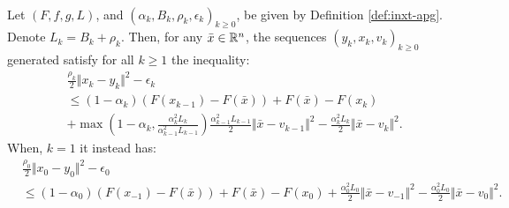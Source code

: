 \documentclass[12pt]{article}
\begin{document}
    \begin{lemma}\; \label{lemma:inxt-apg-cnvg-prep1}\\
        Let $(F, f, g, L)$, and $(\alpha_k, B_k, \rho_k, \epsilon_k)_{k \ge 0}$, be given by Definition \ref{def:inxt-apg}. 
        Denote $L_k = B_k + \rho_k$. 
        Then, for any $\bar x \in \mathbb R^n$, the sequences $(y_k, x_k, v_k)_{k \ge 0}$ generated satisfy for all $k \ge 1$ the inequality: 
        \begin{align*}
            & \frac{\rho_k}{2}\Vert x_k - y_k\Vert^2 - \epsilon_k
            \\
            &\le 
            (1 - \alpha_k)(F(x_{k - 1}) - F(\bar x)) + F(\bar x) - F(x_k) 
            \\ &
            + \max\left(
                    1 - \alpha_k, \frac{\alpha_k^2L_k}{\alpha_{k - 1}^2L_{k - 1}}
                \right)\frac{\alpha_{k - 1}^2L_{k - 1}}{2}\Vert \bar x - v_{k - 1}\Vert^2 
            - \frac{\alpha_k^2L_k}{2}\Vert \bar x - v_k\Vert^2. 
        \end{align*}
        When, $k = 1$ it instead has: 
        \begin{align*}
            & \frac{\rho_0}{2}\Vert x_0 - y_0\Vert^2 - \epsilon_0 
            \\
            &\le 
            (1 - \alpha_0)(F(x_{-1}) - F(\bar x)) + F(\bar x) - F(x_0) 
            + \frac{\alpha_0^2L_0}{2}\Vert \bar x - v_{-1}\Vert^2
            - \frac{\alpha_0^2L_0}{2}\Vert \bar x - v_0\Vert^2. 
        \end{align*}
    \end{lemma}
\end{document}
